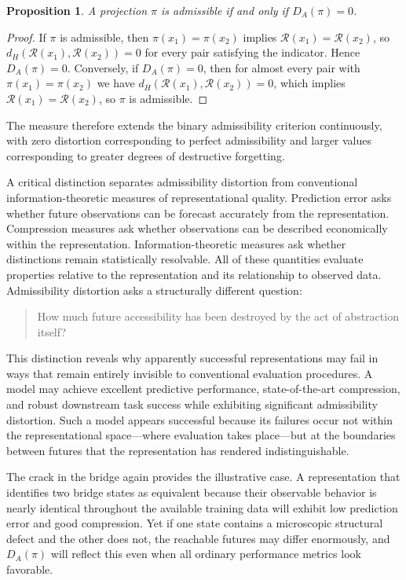 \documentclass[12pt,a4paper]{article}
\theoremstyle{plain}
\newtheorem{proposition}{Proposition}
\theoremstyle{definition}
\theoremstyle{remark}
\begin{document}
\begin{proposition}
A projection $\pi$ is admissible if and only if $D_A(\pi) = 0$.
\end{proposition}

\begin{proof}
If $\pi$ is admissible, then $\pi(x_1) = \pi(x_2)$ implies
$\mathcal{R}(x_1) = \mathcal{R}(x_2)$, so $d_H(\mathcal{R}(x_1),
\mathcal{R}(x_2)) = 0$ for every pair satisfying the indicator. Hence
$D_A(\pi) = 0$. Conversely, if $D_A(\pi) = 0$, then for almost every
pair with $\pi(x_1) = \pi(x_2)$ we have $d_H(\mathcal{R}(x_1),
\mathcal{R}(x_2)) = 0$, which implies $\mathcal{R}(x_1) =
\mathcal{R}(x_2)$, so $\pi$ is admissible.
\end{proof}

The measure therefore extends the binary admissibility criterion continuously,
with zero distortion corresponding to perfect admissibility and larger values
corresponding to greater degrees of destructive forgetting.

A critical distinction separates admissibility distortion from conventional
information-theoretic measures of representational quality. Prediction error
asks whether future observations can be forecast accurately from the
representation. Compression measures ask whether observations can be
described economically within the representation. Information-theoretic
measures ask whether distinctions remain statistically resolvable. All of
these quantities evaluate properties relative to the representation and its
relationship to observed data. Admissibility distortion asks a structurally
different question:

\begin{quote}
  How much future accessibility has been destroyed by the act of
  abstraction itself?
\end{quote}

This distinction reveals why apparently successful representations may fail
in ways that remain entirely invisible to conventional evaluation procedures.
A model may achieve excellent predictive performance, state-of-the-art
compression, and robust downstream task success while exhibiting significant
admissibility distortion. Such a model appears successful because its
failures occur not within the representational space---where evaluation
takes place---but at the boundaries between futures that the representation
has rendered indistinguishable.

The crack in the bridge again provides the illustrative case. A
representation that identifies two bridge states as equivalent because their
observable behavior is nearly identical throughout the available training data
will exhibit low prediction error and good compression. Yet if one state
contains a microscopic structural defect and the other does not, the
reachable futures may differ enormously, and $D_A(\pi)$ will reflect this
even when all ordinary performance metrics look favorable.
\end{document}

